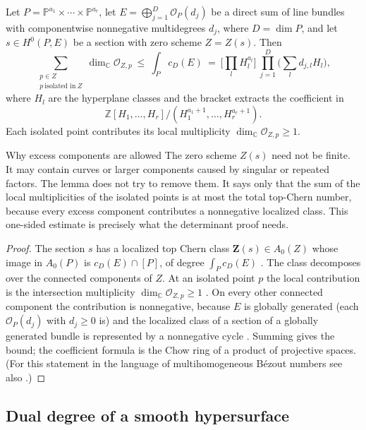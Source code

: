 \documentclass[acmsmall,screen,nonacm]{acmart}
\theoremstyle{definition}
\theoremstyle{remark}
\newcommand{\PP}{\mathbb{P}}
\newcommand{\CC}{\mathbb{C}}
\newcommand{\OO}{\mathcal{O}}
\begin{document}
\begin{lemma}\label{lem:positivity}
Let $P=\PP^{a_1}\times\cdots\times\PP^{a_r}$, let
$E=\bigoplus_{j=1}^{D}\OO_P(d_j)$ be a direct sum of line bundles with
componentwise nonnegative multidegrees $d_j$, where $D=\dim P$, and
let $s\in H^0(P,E)$ be a section with zero scheme $Z=Z(s)$.  Then
\[
  \sum_{\substack{p\in Z\\ p\ \text{isolated in}\ Z}}
  \dim_\CC\OO_{Z,p}
  \ \le\ \int_P c_D(E)
  \ =\ \Big[\textstyle\prod_l H_l^{a_l}\Big]\
  \prod_{j=1}^{D}\Big(\textstyle\sum_l d_{j,l}H_l\Big),
\]
where $H_l$ are the hyperplane classes and the bracket extracts the coefficient in
\[
  \mathbb Z[H_1,\dots,H_r]\big/(H_1^{a_1+1},\dots,H_r^{a_r+1}).
\]
Each
isolated point contributes its local multiplicity
$\dim_\CC\OO_{Z,p}\ge1$.
\end{lemma}

\begin{warningbox}{Why excess components are allowed}
The zero scheme $Z(s)$ need not be finite.  It may contain curves or larger
components caused by singular or repeated factors.  The lemma does not try to
remove them.  It says only that the sum of the local multiplicities of the
isolated points is at most the total top-Chern number, because every excess
component contributes a nonnegative localized class.  This one-sided estimate
is precisely what the determinant proof needs.
\end{warningbox}

\begin{proof}
The section $s$ has a localized top Chern class
$\mathbf Z(s)\in A_0(Z)$ whose image in $A_0(P)$ is $c_D(E)\cap[P]$,
of degree $\int_Pc_D(E)$ \cite[\S14.1]{Fulton98}.  The class
decomposes over the connected components of $Z$.  At an isolated point
$p$ the local contribution is the intersection multiplicity
$\dim_\CC\OO_{Z,p}\ge1$ \cite[\S7.1, \S14.1]{Fulton98}.  On every
other connected component the contribution is nonnegative, because $E$
is globally generated (each $\OO_P(d_j)$ with $d_j\ge0$ is) and the
localized class of a section of a globally generated bundle is
represented by a nonnegative cycle \cite[\S12.2]{Fulton98}.  Summing
gives the bound; the coefficient formula is the Chow ring of a product
of projective spaces.  (For this statement in the language of
multihomogeneous B\'ezout numbers see also
\cite[Ch.~8]{SommeseWampler05}.)
\end{proof}

\subsection{Dual degree of a smooth hypersurface}
\end{document}
